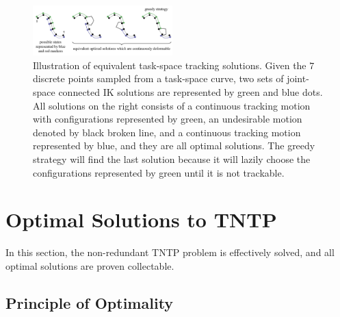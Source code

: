 \documentclass[letterpaper, 10 pt, conference]{ieeeconf}  %
\begin{document}
\begin{figure}[t]
\centering
\includegraphics[width=0.48\textwidth]{figures/greedy}
\caption{Illustration of equivalent task-space tracking solutions. Given the $7$ discrete points sampled from a task-space curve, two sets of joint-space connected IK solutions are represented by green and blue dots. All solutions on the right consists of a continuous tracking motion with configurations represented by green, an undesirable motion denoted by black broken line, and a continuous tracking motion represented by blue, and they are all optimal solutions. The greedy strategy will find the last solution because it will lazily choose the configurations represented by green until it is not trackable. }\label{fig:equiv}
\end{figure}

\section{Optimal Solutions to TNTP}\label{section:solution}
In this section, the non-redundant TNTP problem is effectively solved, and all optimal solutions are proven collectable. 


\subsection{Principle of Optimality}
\end{document}
